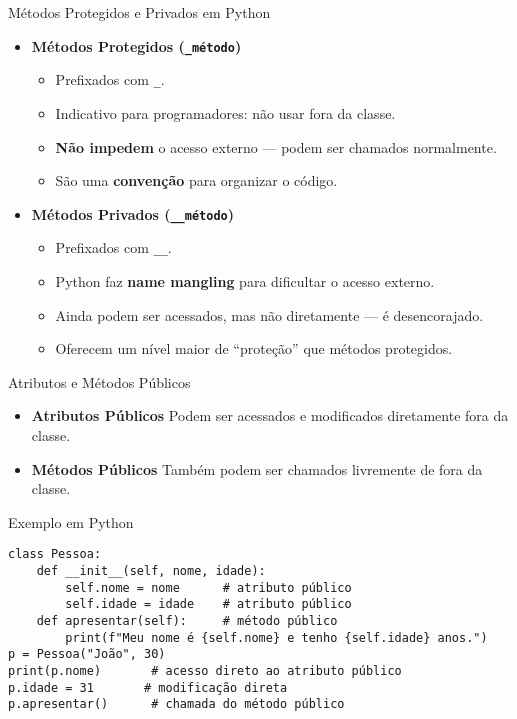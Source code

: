 \begin{frame}[fragile]{Métodos Protegidos e Privados em Python}
    \begin{itemize}
        \item \textbf{Métodos Protegidos (\texttt{\_método})}
              \begin{itemize}
                  \item Prefixados com \texttt{\_}.
                  \item Indicativo para programadores: não usar fora da classe.
                  \item \textbf{Não impedem} o acesso externo — podem ser chamados normalmente.
                  \item São uma \textbf{convenção} para organizar o código.
              \end{itemize}
        \item \textbf{Métodos Privados (\texttt{\_\_método})}
              \begin{itemize}
                  \item Prefixados com \texttt{\_\_}.
                  \item Python faz \textbf{name mangling} para dificultar o acesso externo.
                  \item Ainda podem ser acessados, mas não diretamente — é desencorajado.
                  \item Oferecem um nível maior de “proteção” que métodos protegidos.
              \end{itemize}
    \end{itemize}







\end{frame}


\begin{frame}[fragile]{Atributos e Métodos Públicos}

    \begin{itemize}
        \item \textbf{Atributos Públicos}
              Podem ser acessados e modificados diretamente fora da classe.
        \item \textbf{Métodos Públicos}
              Também podem ser chamados livremente de fora da classe.
    \end{itemize}




    \begin{exampleblock}{Exemplo em Python}
        \begin{verbatim}
class Pessoa:
    def __init__(self, nome, idade):
        self.nome = nome      # atributo público
        self.idade = idade    # atributo público
    def apresentar(self):     # método público
        print(f"Meu nome é {self.nome} e tenho {self.idade} anos.")
p = Pessoa("João", 30)
print(p.nome)       # acesso direto ao atributo público
p.idade = 31       # modificação direta
p.apresentar()      # chamada do método público
\end{verbatim}
    \end{exampleblock}

\end{frame}

